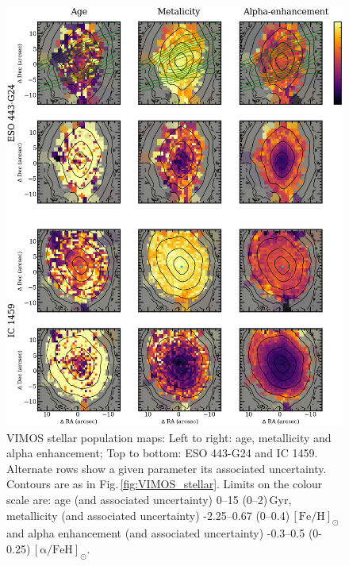 		\begin{figure}
			\centering
			\includegraphics[height=0.63\textheight]{chapter4/vimos/pop1.png}
			\caption[VIMOS stellar population maps]{VIMOS stellar population maps: Left to right: age, metallicity and alpha enhancement; Top to bottom: ESO 443-G24 and IC 1459. Alternate rows show a given parameter its associated uncertainty. Contours are as in Fig.\,\ref{fig:VIMOS_stellar}. Limits on the colour scale are: age (and associated uncertainty) 0--15 (0--2)\,Gyr, metallicity (and associated uncertainty) -2.25--0.67 (0--0.4)\,$\mathrm{[Fe/H]_\odot}$ and alpha enhancement (and associated uncertainty) -0.3--0.5 (0-0.25)\,$\mathrm{[\alpha/FeH]_\odot}$.}
			\label{fig:VIMOS_pop}
		\end{figure}
